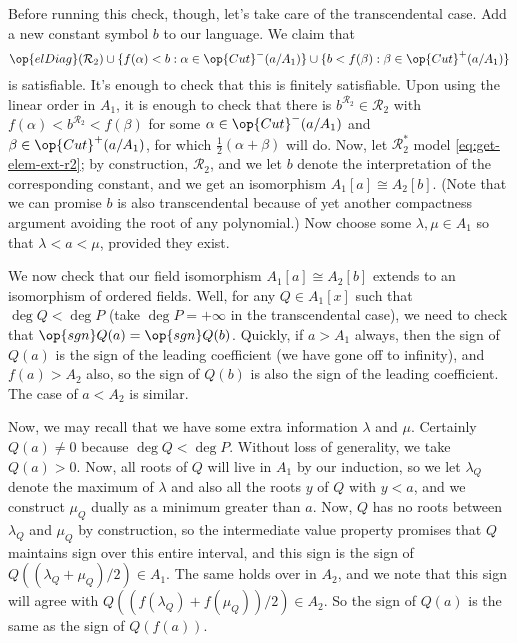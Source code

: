 \documentclass[../notes.tex]{subfiles}
\begin{document}
Before running this check, though, let's take care of the transcendental case. Add a new constant symbol $b$ to our language. We claim that
\begin{equation}
	\op{elDiag}(\mathcal R_2)\cup\{f(\alpha)<b:\alpha\in\op{Cut}^-(a/A_1)\}\cup\{b<f(\beta):\beta\in\op{Cut}^+(a/A_1)\} \label{eq:get-elem-ext-r2}
\end{equation}
is satisfiable. It's enough to check that this is finitely satisfiable. Upon using the linear order in $A_1$, it is enough to check that there is $b^{\mathcal R_2}\in\mathcal R_2$ with $f(\alpha)<b^{\mathcal R_2}<f(\beta)$ for some $\alpha\in\op{Cut}^-(a/A_1)$ and $\beta\in\op{Cut}^+(a/A_1)$, for which $\frac12(\alpha+\beta)$ will do. Now, let $\mathcal R_2^*$ model \eqref{eq:get-elem-ext-r2}; by construction, $\mathcal R_2$, and we let $b$ denote the interpretation of the corresponding constant, and we get an isomorphism $A_1[a]\cong A_2[b]$. (Note that we can promise $b$ is also transcendental because of yet another compactness argument avoiding the root of any polynomial.) Now choose some $\lambda,\mu\in A_1$ so that $\lambda<a<\mu$, provided they exist.

We now check that our field isomorphism $A_1[a]\cong A_2[b]$ extends to an isomorphism of ordered fields. Well, for any $Q\in A_1[x]$ such that $\deg Q<\deg P$ (take $\deg P=+\infty$ in the transcendental case), we need to check that $\op{sgn}Q(a)=\op{sgn}Q(b)$. Quickly, if $a>A_1$ always, then the sign of $Q(a)$ is the sign of the leading coefficient (we have gone off to infinity), and $f(a)>A_2$ also, so the sign of $Q(b)$ is also the sign of the leading coefficient. The case of $a<A_2$ is similar.

Now, we may recall that we have some extra information $\lambda$ and $\mu$. Certainly $Q(a)\ne0$ because $\deg Q<\deg P$. Without loss of generality, we take $Q(a)>0$. Now, all roots of $Q$ will live in $A_1$ by our induction, so we let $\lambda_Q$ denote the maximum of $\lambda$ and also all the roots $y$ of $Q$ with $y<a$, and we construct $\mu_Q$ dually as a minimum greater than $a$. Now, $Q$ has no roots between $\lambda_Q$ and $\mu_Q$ by construction, so the intermediate value property promises that $Q$ maintains sign over this entire interval, and this sign is the sign of $Q((\lambda_Q+\mu_Q)/2)\in A_1$. The same holds over in $A_2$, and we note that this sign will agree with $Q((f(\lambda_Q)+f(\mu_Q))/2)\in A_2$. So the sign of $Q(a)$ is the same as the sign of $Q(f(a))$.
\end{document}
